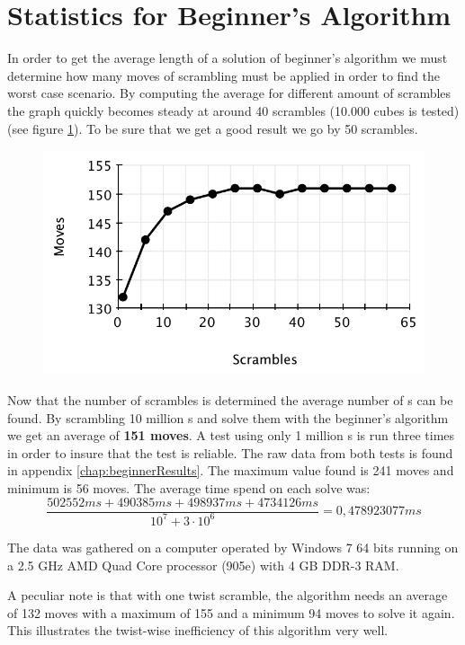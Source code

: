\section{Statistics for Beginner's Algorithm}
\label{sec:beginnersStat}
In order to get the average length of a solution of beginner's algorithm we must determine how many moves of scrambling must be applied in order to find the worst case scenario. 
By computing the average for different amount of scrambles the graph quickly becomes steady at around 40 scrambles (10.000 cubes is tested) (see figure \ref{fig:beginnersScramble}). To be sure that we get a good result we go by 50 scrambles.
\begin{figure}[htbp]
	\centering
		\includegraphics{input/pics/beginnersScramble.pdf}
	\caption{}
	\label{fig:beginnersScramble}
\end{figure}

Now that the number of scrambles is determined the average number of \twist{}s can be found.
By scrambling 10 million \cube{}s and solve them with the beginner's algorithm we get an average of \textbf{151 moves}.
A test using only 1 million \rubik{}s is run three times in order to insure that the test is reliable.
The raw data from both tests is found in appendix \ref{chap:beginnerResults}.
The maximum value found is 241 moves and minimum is 56 moves.
The average time spend on each solve was:
\[
\frac{502552ms+490385ms+498937ms+4734126ms}{10^{7} + 3 \cdot 10^{6}} = 0,478923077ms
\]

The data was gathered on a computer operated by Windows 7 64 bits running on a 2.5 GHz AMD Quad Core processor (905e) with 4 GB DDR-3 RAM.

A peculiar note is that with one twist scramble, the algorithm needs an average of 132 moves with a maximum of 155 and a minimum 94 moves to solve it again.
This illustrates the twist-wise inefficiency of this algorithm very well.
